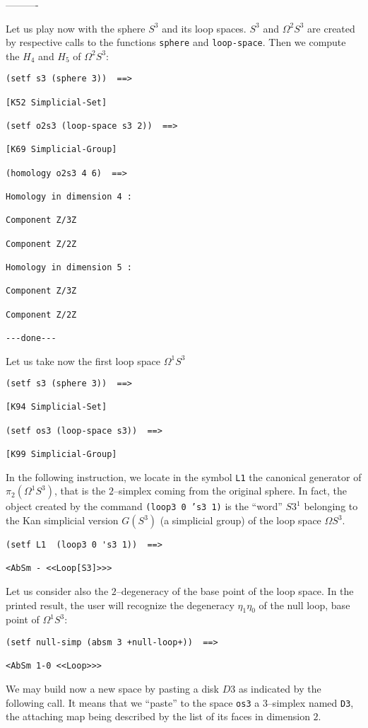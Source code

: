 \begin{center}
----------
\end{center}
Let us play now with the sphere $S^3$ and its loop spaces. $S^3$ and $\Omega^2 S^3$ are created by
respective calls to the functions {\tt sphere} and {\tt loop-space}. Then we compute the $H_4$ and $H_5$
of $\Omega^2 S^3$:
{\footnotesize\begin{verbatim}
(setf s3 (sphere 3))  ==>

[K52 Simplicial-Set]

(setf o2s3 (loop-space s3 2))  ==>

[K69 Simplicial-Group]

(homology o2s3 4 6)  ==>

Homology in dimension 4 :

Component Z/3Z

Component Z/2Z

Homology in dimension 5 :

Component Z/3Z

Component Z/2Z

---done---
\end{verbatim}}
\newpage
Let us take now the first loop space $\Omega^1 S^3$
{\footnotesize\begin{verbatim}
(setf s3 (sphere 3))  ==>

[K94 Simplicial-Set]

(setf os3 (loop-space s3))  ==>

[K99 Simplicial-Group]
\end{verbatim}}
In the following instruction, we locate in the symbol {\tt L1} the canonical generator of
$\pi_2 (\Omega^1S^3)$, that is the $2$--simplex coming from the original sphere. In fact, the object
created by the command {\tt (loop3 0 's3 1)} is the ``word'' $S3^1$ belonging to the
Kan simplicial version $G(S^3)$ (a simplicial group) of the loop space $\Omega S^3$.
{\footnotesize\begin{verbatim}
(setf L1  (loop3 0 's3 1))  ==>

<AbSm - <<Loop[S3]>>>
\end{verbatim}}
Let us consider also the $2$--degeneracy of the base point of the loop space. In the printed
result, the user will recognize the degeneracy $\eta_1\eta_0$ of the null loop, base point of
$\Omega^1 S^3$:
{\footnotesize\begin{verbatim}
(setf null-simp (absm 3 +null-loop+))  ==>

<AbSm 1-0 <<Loop>>>
\end{verbatim}}
We may  build now a new space by pasting a disk $D3$ as indicated by the
following call. It means that we ``paste'' to the space {\tt os3} a $3$--simplex named {\tt D3},
the attaching map being described by the list of its faces in dimension $2$.

